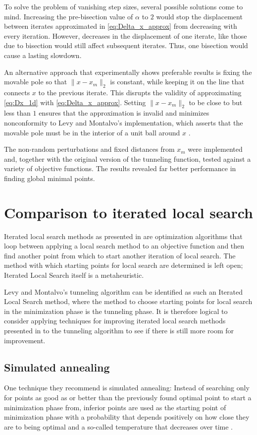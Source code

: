 \documentclass[a4paper,12pt,twoside]{article}
\begin{document}
To solve the problem of vanishing step sizes, several possible solutions come to mind. Increasing the pre-bisection value of $\alpha$ to $2$ would stop the displacement between iterates approximated in \eqref{eq:Delta_x_approx} from decreasing with every iteration. However, decreases in the displacement of one iterate, like those due to bisection would still affect subsequent iterates. Thus, one bisection would cause a lasting slowdown.

An alternative approach that experimentally shows preferable results is fixing the movable pole so that $\| x-x_m\|_2$ is constant, while keeping it on the line that connects $x$ to the previous iterate. This disrupts the validity of approximating \eqref{eq:Dx_1d} with \eqref{eq:Delta_x_approx}. Setting $\| x-x_m\|_2$ to be close to but less than $1$ ensures that the approximation is invalid and minimizes nonconformity to Levy and Montalvo's implementation, which asserts that the movable pole must be in the interior of a unit ball around $x$ \cite[27]{levy_tunneling_1985}.

The non-random perturbations and fixed distances from $x_m$ were implemented and, together with the original version of the tunneling function, tested against a variety of objective functions. The results revealed far better performance in finding global minimal points. 


\section{Comparison to iterated local search}
Iterated local search methods as presented in \cite{lourenco_iterated_2003} are optimization algorithms that loop between applying a local search method to an objective function and then find another point from which to start another iteration of local search. The method with which starting points for local search are determined is left open; Iterated Local Search itself is a metaheuristic.

Levy and Montalvo's tunneling algorithm can be identified as such an Iterated Local Search method, where the method to choose starting points for local search in the minimization phase is the tunneling phase. It is therefore logical to consider applying techniques for improving iterated local search methods presented in \cite{lourenco_iterated_2003} to the tunneling algorithm to see if there is still more room for improvement.

\subsection{Simulated annealing}
One technique they recommend is simulated annealing: Instead of searching only for points as good as or better than the previously found optimal point to start a minimization phase from, inferior points are used as the starting point of minimization phase with a probability that depends positively on how close they are to being optimal and a so-called temperature that decreases over time \cite[\S 5.3.3]{lourenco_iterated_2003}.
\end{document}
